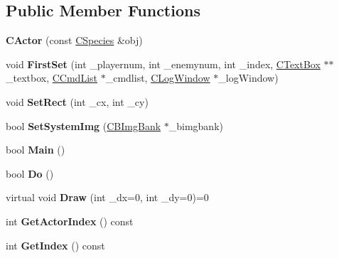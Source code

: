 \subsection*{Public Member Functions}
\begin{DoxyCompactItemize}
\item 
{\bfseries C\+Actor} (const \hyperlink{class_c_species}{C\+Species} \&obj)\hypertarget{class_c_actor_a5bae9b0347cfe0c298ae14d1ddc4670a}{}\label{class_c_actor_a5bae9b0347cfe0c298ae14d1ddc4670a}

\item 
void {\bfseries First\+Set} (int \+\_\+playernum, int \+\_\+enemynum, int \+\_\+index, \hyperlink{class_c_text_box}{C\+Text\+Box} $\ast$$\ast$\+\_\+textbox, \hyperlink{class_c_cmd_list}{C\+Cmd\+List} $\ast$\+\_\+cmdlist, \hyperlink{class_c_log_window}{C\+Log\+Window} $\ast$\+\_\+log\+Window)\hypertarget{class_c_actor_aab10562dcc6b8601c3986d18b0636727}{}\label{class_c_actor_aab10562dcc6b8601c3986d18b0636727}

\item 
void {\bfseries Set\+Rect} (int \+\_\+cx, int \+\_\+cy)\hypertarget{class_c_actor_a7cffff5d6184ebe6bc1a39154a3f8503}{}\label{class_c_actor_a7cffff5d6184ebe6bc1a39154a3f8503}

\item 
bool {\bfseries Set\+System\+Img} (\hyperlink{class_c_b_img_bank}{C\+B\+Img\+Bank} $\ast$\+\_\+bimgbank)\hypertarget{class_c_actor_ab7adce3f7a83b3ccac0f961177ecf3da}{}\label{class_c_actor_ab7adce3f7a83b3ccac0f961177ecf3da}

\item 
bool {\bfseries Main} ()\hypertarget{class_c_actor_a988ae25f3fa7f8767415260b3ee00023}{}\label{class_c_actor_a988ae25f3fa7f8767415260b3ee00023}

\item 
bool {\bfseries Do} ()\hypertarget{class_c_actor_a1c9fd5d3fa2eb222ff4c4bf94bd58140}{}\label{class_c_actor_a1c9fd5d3fa2eb222ff4c4bf94bd58140}

\item 
virtual void {\bfseries Draw} (int \+\_\+dx=0, int \+\_\+dy=0)=0\hypertarget{class_c_actor_ac200b40b264c90ac18641ae70913924e}{}\label{class_c_actor_ac200b40b264c90ac18641ae70913924e}

\item 
int {\bfseries Get\+Actor\+Index} () const \hypertarget{class_c_actor_afe5b8dc29fe5f77fa972ca6d0c99c109}{}\label{class_c_actor_afe5b8dc29fe5f77fa972ca6d0c99c109}

\item 
int {\bfseries Get\+Index} () const \hypertarget{class_c_actor_aad14d3764562877bf0c479ff596edc6a}{}\label{class_c_actor_aad14d3764562877bf0c479ff596edc6a}


\end{DoxyCompactItemize}
